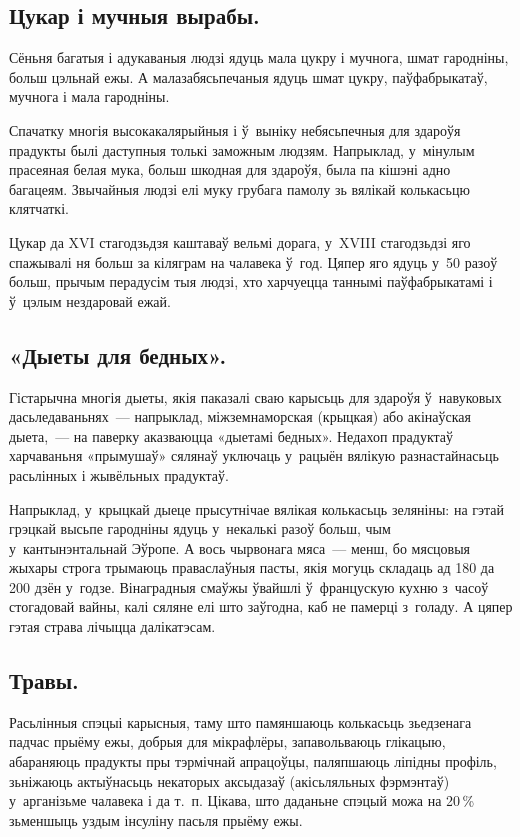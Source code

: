 \subsection*{Цукар і мучныя вырабы.}

Сёньня багатыя і адукаваныя людзі ядуць мала цукру і мучнога, шмат гародніны, больш цэльнай ежы. А малазабясьпечаныя ядуць шмат цукру, паўфабрыкатаў, мучнога і мала гародніны.

Спачатку многія высокакалярыйныя і ў~выніку небясьпечныя для здароўя прадукты былі даступныя толькі заможным людзям. Напрыклад, у~мінулым прасеяная белая мука, больш шкодная для здароўя, была па кішэні адно багацеям. Звычайныя людзі елі муку грубага памолу зь вялікай колькасьцю клятчаткі.

Цукар да XVI стагодзьдзя каштаваў вельмі дорага, у~XVIII стагодзьдзі яго спажывалі ня больш за кіляграм на чалавека ў~год. Цяпер яго ядуць у~50 разоў больш, прычым перадусім тыя людзі, хто харчуецца таннымі паўфабрыкатамі і ў~цэлым нездаровай ежай.

\subsection*{«Дыеты для бедных».}

Гістарычна многія дыеты, якія паказалі сваю карысьць для здароўя ў~навуковых дасьледаваньнях~--- напрыклад, міжземнаморская (крыцкая) або акінаўская дыета,~--- на паверку аказваюцца «дыетамі бедных». Недахоп прадуктаў харчаваньня «прымушаў» сялянаў уключаць у~рацыён вялікую разнастайнасьць расьлінных і жывёльных прадуктаў.

Напрыклад, у~крыцкай дыеце прысутнічае вялікая колькасьць зеляніны: на гэтай грэцкай высьпе гародніны ядуць у~некалькі разоў больш, чым у~кантынэнтальнай Эўропе. А вось чырвонага мяса~--- менш, бо мясцовыя жыхары строга трымаюць праваслаўныя пасты, якія могуць складаць ад 180 да 200 дзён у~годзе. Вінаградныя смаўжы ўвайшлі ў~францускую кухню з~часоў стогадовай вайны, калі сяляне елі што заўгодна, каб не памерці з~голаду. А цяпер гэтая страва лічыцца далікатэсам.

\subsection*{Травы.}

Расьлінныя спэцыі карысныя, таму што памяншаюць колькасьць зьедзенага падчас прыёму ежы, добрыя для мікрафлёры, запавольваюць глікацыю, абараняюць прадукты пры тэрмічнай апрацоўцы, паляпшаюць ліпідны профіль, зьніжаюць актыўнасьць некаторых аксыдазаў (акісьляльных фэрмэнтаў) у~арганізьме чалавека і да т.~п. Цікава, што даданьне спэцый можа на 20\,\% зьменшыць уздым інсуліну пасьля прыёму ежы.

